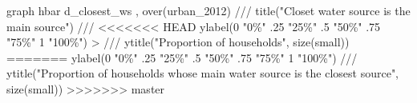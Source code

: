 graph hbar d_closest_ws , over(urban_2012) ///
        title("Closet water source is the main source") ///
<<<<<<< HEAD
        ylabel(0 "0\%" .25 "25\%" .5 "50\%" .75 "75\%" 1 "100\%") 
> ///
        ytitle("Proportion of households", size(small))
=======
        ylabel(0 "0\%" .25 "25\%" .5 "50\%" .75 "75\%" 1 "100\%") ///
        ytitle("Proportion of households whose main water source is the closest source", size(small))
>>>>>>> master
